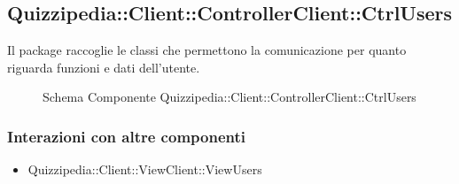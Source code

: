 \subsection{Quizzipedia::Client::ControllerClient::CtrlUsers}
Il package raccoglie le classi che permettono la comunicazione per quanto riguarda funzioni e dati dell'utente.
\begin{figure}[H]
\centering
\noindent{}
\caption[Schema Componente Quizzipedia::Client::ControllerClient::CtrlUsers]{Schema Componente Quizzipedia::Client::ControllerClient::CtrlUsers}
\end{figure}
\subsubsection{Interazioni con altre componenti}
\begin{itemize}
\item Quizzipedia::Client::ViewClient::ViewUsers
\end{itemize}
